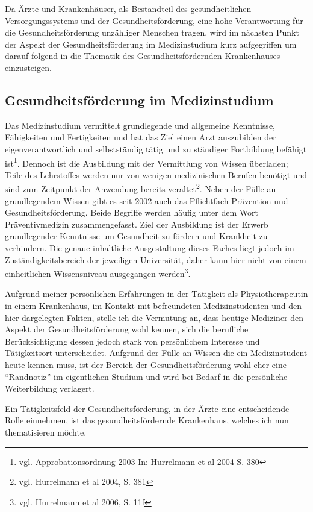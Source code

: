 Da Ärzte und Krankenhäuser, als Bestandteil des gesundheitlichen Versorgungssystems und der Gesundheitsförderung, eine hohe Verantwortung für die Gesundheitsförderung unzähliger Menschen tragen, wird im nächsten Punkt der Aspekt der Gesundheitsförderung im Medizinstudium kurz aufgegriffen um darauf folgend in die Thematik des Gesundheitsfördernden Krankenhauses einzusteigen.

\subsection{Gesundheitsförderung im Medizinstudium}
\label{sec:GesundheitsförderungImMedizinstudium}

Das Medizinstudium vermittelt grundlegende und allgemeine Kenntnisse, Fähigkeiten und Fertigkeiten und hat das Ziel einen Arzt auszubilden der eigenverantwortlich und selbstständig tätig und zu ständiger Fortbildung befähigt ist\footnote{vgl. Approbationsordnung 2003 In: Hurrelmann et al 2004 S. 380}. Dennoch ist die Ausbildung mit der Vermittlung von Wissen überladen; Teile des Lehrstoffes werden nur von wenigen medizinischen Berufen benötigt und sind zum Zeitpunkt der Anwendung bereits veraltet\footnote{vgl. Hurrelmann et al 2004, S. 381}. Neben der Fülle an grundlegendem Wissen gibt es seit 2002 auch das Pflichtfach Prävention und Gesundheitsförderung. Beide Begriffe werden häufig unter dem Wort Präventivmedizin zusammengefasst. Ziel der Ausbildung ist der Erwerb grundlegender Kenntnisse um Gesundheit zu fördern und Krankheit zu verhindern. Die genaue inhaltliche Ausgestaltung dieses Faches liegt jedoch im Zuständigkeitsbereich der jeweiligen Universität, daher kann hier nicht von einem einheitlichen Wissensniveau ausgegangen werden\footnote{vgl. Hurrelmann et al 2006, S. 11f}. 

Aufgrund meiner persönlichen Erfahrungen in der Tätigkeit als Physiotherapeutin in einem Krankenhaus, im Kontakt mit befreundeten Medizinstudenten und den hier dargelegten Fakten, stelle ich die Vermutung an, dass heutige Mediziner den Aspekt der Gesundheitsförderung wohl kennen, sich die berufliche Berücksichtigung dessen jedoch stark von persönlichem Interesse und Tätigkeitsort unterscheidet. Aufgrund der Fülle an Wissen die ein Medizinstudent heute kennen muss, ist der Bereich der Gesundheitsförderung wohl eher eine "`Randnotiz"' im eigentlichen Studium und wird bei Bedarf in die persönliche Weiterbildung verlagert. 

Ein Tätigkeitsfeld der Gesundheitsförderung, in der Ärzte eine entscheidende Rolle einnehmen, ist das gesundheitsfördernde Krankenhaus, welches ich nun thematisieren möchte.

